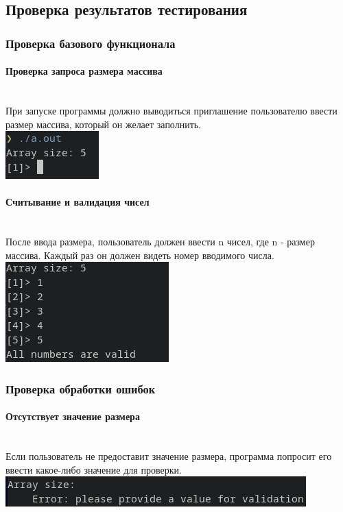 \documentclass[a4paper, 12pt]{article}
\begin{document}
\subsection{Проверка результатов тестирования}


\subsubsection{Проверка базового функционала}


\paragraph{Проверка запроса размера массива}\mbox{}\\
При запуске программы должно выводиться приглашение пользователю ввести размер
массива, который он желает заполнить.\\
\includegraphics{arr_size_print.png}


\paragraph{Считывание и валидация чисел}\mbox{}\\
После ввода размера, пользователь должен ввести n чисел,
где n - размер массива. Каждый раз он должен видеть номер
вводимого числа.\\
\includegraphics{input_accrept.png}


\subsubsection{Проверка обработки ошибок}
\paragraph{Отсутствует значение размера}\mbox{}\\
Если пользователь не предоставит значение размера,
программа попросит его ввести какое-либо значение для проверки.\\
\includegraphics{no_input_size.png}
\end{document}
